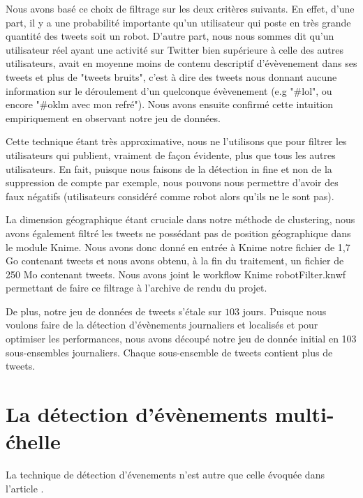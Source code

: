 \documentclass[12pt]{article}
\begin{document}
Nous avons bas\'e ce choix de filtrage sur les deux crit\`eres suivants. En effet, d'une part, il y a une probabilit\'e importante qu'un utilisateur qui poste en tr\`es grande quantit\'e des tweets soit un robot. D'autre part, nous nous sommes dit qu'un utilisateur r\'eel ayant une activit\'e sur Twitter bien sup\'erieure \`{a} celle des autres utilisateurs, avait en moyenne moins de contenu descriptif d'\'ev\`evenement dans ses tweets et plus de "tweets bruits", c'est \`{a} dire des tweets nous donnant aucune information sur le d\'eroulement d'un quelconque \'ev\`evenement (e.g "\#lol", ou encore "\#oklm avec mon refr\'e"). Nous avons ensuite confirm\'e cette intuition empiriquement en observant notre jeu de donn\'ees.  

Cette technique \'etant tr\`es approximative, nous ne l'utilisons que pour filtrer les utilisateurs qui publient, vraiment de fa\c{c}on \'evidente, plus que tous les autres utilisateurs. En fait, puisque nous faisons de la d\'etection in fine et non de la suppression de compte par exemple, nous pouvons nous permettre d'avoir des faux n\'egatifs (utilisateurs consid\'er\'e comme robot alors qu'ils ne le sont pas). 

La dimension g\'eographique \'etant cruciale dans notre m\'ethode de clustering, nous avons \'egalement filtr\'e les tweets ne poss\'edant pas de position g\'eographique dans le module Knime. Nous avons donc donn\'e en entr\'ee \`{a} Knime notre fichier de 1,7 Go contenant  tweets et nous avons obtenu, \`{a} la fin du traitement, un fichier de 250 Mo contenant  tweets. Nous avons joint le workflow Knime robotFilter.knwf permettant de faire ce filtrage \`a l'archive de rendu du projet.

De plus, notre jeu de donn\'ees de tweets s'\'etale sur $103$ jours. Puisque nous voulons faire de la d\'etection d'\'ev\`enements journaliers et localis\'es et pour optimiser les performances, nous avons d\'ecoup\'e notre jeu de donn\'ee initial en 103 sous-ensembles journaliers. Chaque sous-ensemble de tweets contient plus de  tweets.

\vfill
\newpage

\section{La d\'etection d'\'ev\`enements multi-\'chelle}
\label{sec:multiscale}

La technique de d\'etection d'\'evenements n'est autre que celle \'evoqu\'ee dans l'article \cite{Multievents}.
\end{document}

